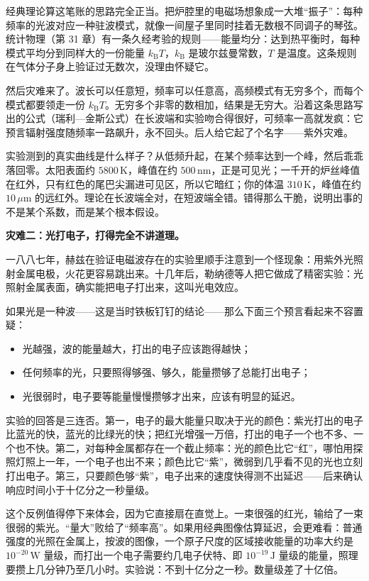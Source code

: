 经典理论算这笔账的思路完全正当。把炉腔里的电磁场想象成一大堆“振子”：每种频率的光波对应一种驻波模式，就像一间屋子里同时挂着无数根不同调子的琴弦。统计物理（第 31 章）有一条久经考验的规则——能量均分：达到热平衡时，每种模式平均分到同样大的一份能量 \(k_{\mathrm{B}}T\)，\(k_{\mathrm{B}}\) 是玻尔兹曼常数，\(T\) 是温度。这条规则在气体分子身上验证过无数次，没理由怀疑它。

然后灾难来了。波长可以任意短，频率可以任意高，高频模式有无穷多个，而每个模式都要领走一份 \(k_{\mathrm{B}}T\)。无穷多个非零的数相加，结果是无穷大。沿着这条思路写出的公式（瑞利—金斯公式）在长波端和实验吻合得很好，可频率一高就发疯：它预言辐射强度随频率一路飙升，永不回头。后人给它起了个名字——紫外灾难。

实验测到的真实曲线是什么样子？从低频升起，在某个频率达到一个峰，然后乖乖落回零。太阳表面约 \(5800\,\mathrm{K}\)，峰值在约 \(500\,\mathrm{nm}\)，正是可见光；一千开的炉丝峰值在红外，只有红色的尾巴尖漏进可见区，所以它暗红；你的体温 \(310\,\mathrm{K}\)，峰值在约 \(10\,\mu\mathrm{m}\) 的远红外。理论在长波端全对，在短波端全错。错得那么干脆，说明出事的不是某个系数，而是某个根本假设。

\textbf{灾难二：光打电子，打得完全不讲道理。}

一八八七年，赫兹在验证电磁波存在的实验里顺手注意到一个怪现象：用紫外光照射金属电极，火花更容易跳出来。十几年后，勒纳德等人把它做成了精密实验：光照射金属表面，确实能把电子打出来，这叫光电效应。

如果光是一种波——这是当时铁板钉钉的结论——那么下面三个预言看起来不容置疑：

\begin{itemize}[leftmargin=1.8em]
\item 光越强，波的能量越大，打出的电子应该跑得越快；
\item 任何频率的光，只要照得够强、够久，能量攒够了总能打出电子；
\item 光很弱时，电子要等能量慢慢攒够才出来，应该有明显的延迟。
\end{itemize}

实验的回答是三连否。第一，电子的最大能量只取决于光的颜色：紫光打出的电子比蓝光的快，蓝光的比绿光的快；把红光增强一万倍，打出的电子一个也不多、一个也不快。第二，对每种金属都存在一个截止频率：光的颜色比它“红”，哪怕用探照灯照上一年，一个电子也出不来；颜色比它“紫”，微弱到几乎看不见的光也立刻打出电子。第三，只要颜色够“紫”，电子出来的速度快得测不出延迟——后来确认响应时间小于十亿分之一秒量级。

这个反例值得停下来体会，因为它直接扇在直觉上。一束很强的红光，输给了一束很弱的紫光。“量大”败给了“频率高”。如果用经典图像估算延迟，会更难看：普通强度的光照在金属上，按波的图像，一个原子尺度的区域接收能量的功率大约是 \(10^{-20}\,\mathrm{W}\) 量级，而打出一个电子需要约几电子伏特、即 \(10^{-19}\,\mathrm{J}\) 量级的能量，照理要攒上几分钟乃至几小时。实验说：不到十亿分之一秒。数量级差了十亿倍。

